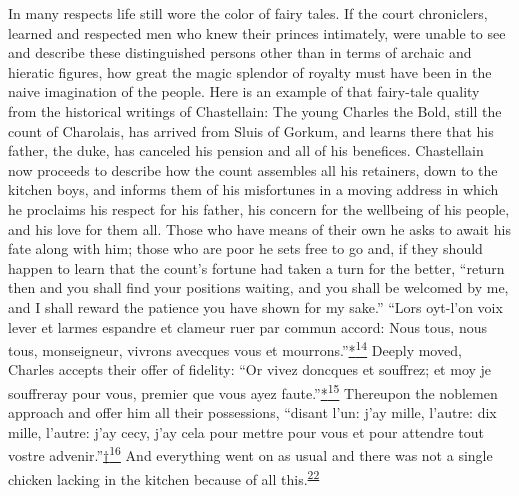 In many respects life still wore the color of fairy tales. If the court
chroniclers, learned and respected men who knew their princes
intimately, were unable to see and describe these distinguished persons
other than in terms of archaic and hieratic figures, how great the magic
splendor of royalty must have been in the naive imagination of the
people. Here is an example of that fairy-tale quality from the
historical writings of Chastellain: The young Charles the Bold, still
the count of Charolais, has arrived from Sluis of Gorkum, and learns
there that his father, the duke, has canceled his pension and all of his
benefices. Chastellain now proceeds to describe how the count assembles
all his retainers, down to the kitchen boys, and informs them of his
misfortunes in a moving address in which he proclaims his respect for
his father, his concern for the wellbeing of his people, and his love
for them all. Those who have means of their own he asks to await his
fate along with him; those who are poor he sets free to go and, if they
should happen to learn that the count's fortune had taken a turn for the
better, ``return then and you shall find your positions waiting, and you
shall be welcomed by me, and I shall reward the patience you have shown
for my sake.'' ``Lors oyt-l'on voix lever et larmes espandre et clameur
ruer par commun accord: Nous tous, nous tous, monseigneur, vivrons
avecques vous et
mourrons.''\protect\hypertarget{08_Chapter_One__THE_PASSIONATE_INTE.xhtmlux5cux23id_2273}{\protect\hyperlink{23_NOTES.xhtmlux5cux23id_2272}{*\textsuperscript{14}}}
Deeply moved,
\protect\hypertarget{08_Chapter_One__THE_PASSIONATE_INTE.xhtmlux5cux23page_10}{}{}Charles
accepts their offer of fidelity: ``Or vivez doncques et souffrez; et moy
je souffreray pour vous, premier que vous ayez
faute.''\protect\hypertarget{08_Chapter_One__THE_PASSIONATE_INTE.xhtmlux5cux23id_2277}{\protect\hyperlink{23_NOTES.xhtmlux5cux23id_2276}{*\textsuperscript{15}}}
Thereupon the noblemen approach and offer him all their possessions,
``disant l'un: j'ay mille, l'autre: dix mille, l'autre: j'ay cecy, j'ay
cela pour mettre pour vous et pour attendre tout vostre
advenir.''\protect\hypertarget{08_Chapter_One__THE_PASSIONATE_INTE.xhtmlux5cux23id_2275}{\protect\hyperlink{23_NOTES.xhtmlux5cux23id_2280}{†\textsuperscript{16}}}
And everything went on as usual and there was not a single chicken
lacking in the kitchen because of all
this.\textsuperscript{\protect\hypertarget{08_Chapter_One__THE_PASSIONATE_INTE.xhtmlux5cux23id_2186}{\protect\hyperlink{23_NOTES.xhtmlux5cux23id_2187}{22}}}

